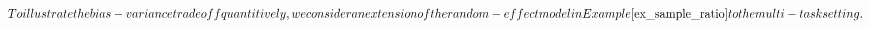 \documentclass[aos,preprint]{imsart}
\begin{document}
\begin{equation}

To illustrate the {bias-variance tradeoff quantitively, we consider an extension of the random-effect model in Example \ref{ex_sample_ratio} to the multi-task setting. %


}
\end{equation}
\end{document}
